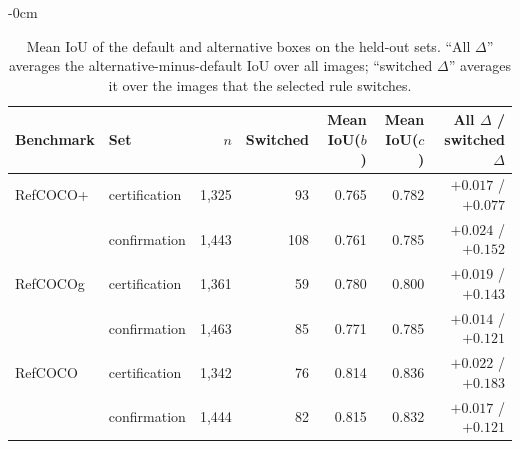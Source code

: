 \begin{table}[H]
\begin{adjustwidth}{-\extralength}{0cm}
\caption{Mean IoU of the default and alternative boxes on the held-out sets.
``All $\Delta$'' averages the alternative-minus-default IoU over all images;
``switched $\Delta$'' averages it over the images that the selected rule
switches.\label{tab:continuous-iou}}
\centering
\small
\begin{tabular}{@{}llrrrrr@{}}
\toprule
Benchmark & Set & $n$ & Switched & Mean IoU($b$) & Mean IoU($c$) & All $\Delta$ / switched $\Delta$ \\
\midrule
RefCOCO+ & certification & 1{,}325 & 93 & 0.765 & 0.782 & $+0.017$ / $+0.077$ \\
 & confirmation & 1{,}443 & 108 & 0.761 & 0.785 & $+0.024$ / $+0.152$ \\
RefCOCOg & certification & 1{,}361 & 59 & 0.780 & 0.800 & $+0.019$ / $+0.143$ \\
 & confirmation & 1{,}463 & 85 & 0.771 & 0.785 & $+0.014$ / $+0.121$ \\
RefCOCO & certification & 1{,}342 & 76 & 0.814 & 0.836 & $+0.022$ / $+0.183$ \\
 & confirmation & 1{,}444 & 82 & 0.815 & 0.832 & $+0.017$ / $+0.121$ \\
\bottomrule
\end{tabular}
\end{adjustwidth}
\end{table}
